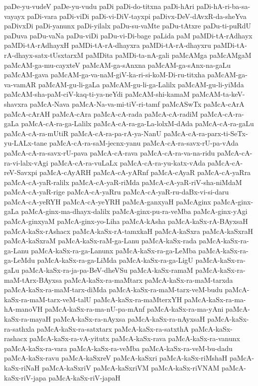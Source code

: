 {paDe-yu-vudeV
paDe-yu-vudu
paDi
paDi-do-titxna
paDi-hAri
paDi-hA-ri-ba-sa-vayayx
paDi-vara
paDi-viDi
paDi-vi-DiV-tayxpi
paDivx-DeV-dAvxR-da-sheYva
paDivxDi
paDi-yanunx
paDi-yilalx
paDu-su-vaMte
paDu-tAtxre
paDu-ti-puRdU
paDuva
paDu-vaNa
paDu-viDi
paDu-vi-Di-bage
paLida
paM
paMDi-tA-rAdhayx
paMDi-tA-rAdhayxH
paMDi-tA-rA-dhayxra
paMDi-tA-rA-dhayxru
paMDi-tA-rA-dhayx-satx-tUsxtarxM
paMDita
paMDi-ta-nA-gali
paMcAMga
paMcAMgaM
paMcAM-ga-mu-cayxteV
paMcAM-ga-sAnxna
paMcAM-ga-sAnx-na-gaLu
paMcAM-gava
paMcAM-ga-va-naM-giV-ka-ri-si-koM-Di-ru-titxha
paMcAM-ga-va-vamAR
paMcAM-gu-li-gaLa
paMcAM-gu-li-ga-Lalilx
paMcAM-gu-li-yiMda
paMcAM-sha-paM-ciV-kaq-ti-ya-neYdi
paMcAM-shi-kamaM
paMcAM-ta-keV-shavxra
paMcA-Nava
paMcA-Na-va-mi-tiV-ri-tamf
paMcASwTx
paMcA-cArA
paMcA-cArAH
paMcA-cAra
paMcA-cA-rada
paMcA-cA-radiM
paMcA-cA-ra-gaLa
paMcA-cA-ra-ga-Lalilx
paMcA-cA-ra-ga-La-lolxM-dAda
paMcA-cA-ra-gaLu
paMcA-cA-ra-mUtiR
paMcA-cA-ra-pa-rA-ya-NanU
paMcA-cA-ra-parx-ti-SeTx-yu-LALx-tane
paMcA-cA-ra-saM-jecnx-yanu
paMcA-cA-ra-savx-rU-pa-vAda
paMcA-cA-ra-savx-rU-pava
paMcA-cA-rava
paMcA-cA-ra-va-na-ridu
paMcA-cA-ra-vi-lalx-vAgi
paMcA-cA-ra-vuLaLx
paMcA-cA-ra-yu-katx-vAda
paMcA-cA-reV-Savxpi
paMcA-cAyARH
paMcA-cA-yARnf
paMcA-cAyaR
paMcA-cA-yaRra
paMcA-cA-yaR-ralilx
paMcA-cA-yaR-riMda
paMcA-cA-yaR-riV-sha-niMdaM
paMcA-cA-yaR-rige
paMcA-cA-yaRru
paMcA-cA-yaR-ru-daBx-vi-si-daru
paMcA-cA-yeRYH
paMcA-cA-yeYRH
paMcA-ganxyaH
paMcAginx
paMcA-ginx-gaLa
paMcA-ginx-ma-dhayx-dalilx
paMcA-ginx-pu-ra-veMba
paMcA-ginx-yAgi
paMcA-ginxyaM
paMcA-ginx-yo-Liha
paMcA-kAsha
paMcA-kaSx-rA-BAyxsaH
paMcA-kaSx-rAshacx
paMcA-kaSx-rA-tamxkaH
paMcA-kaSxra
paMcA-kaSxraH
paMcA-kaSxraM
paMcA-kaSx-raM-ga-Lanu
paMcA-kaSx-rada
paMcA-kaSx-ra-ga-Lanu
paMcA-kaSx-ra-ga-Lanunx
paMcA-kaSx-ra-ga-LeMba
paMcA-kaSx-ra-ga-LeMdu
paMcA-kaSx-ra-ga-LiMda
paMcA-kaSx-ra-ga-LigU
paMcA-kaSx-ra-gaLu
paMcA-kaSx-ra-ja-pa-BeV-dheVSu
paMcA-kaSx-ramaM
paMcA-kaSx-ra-maM-tArx-BAyxsa
paMcA-kaSx-ra-maMtarx
paMcA-kaSx-ra-maM-tarxda
paMcA-kaSx-ra-maM-tarx-diMda
paMcA-kaSx-ra-maM-tarx-veM-budu
paMcA-kaSx-ra-maM-tarx-veM-talU
paMcA-kaSx-ra-maMterxYH
paMcA-kaSx-ra-ma-hA-manoVH
paMcA-kaSx-ra-ma-nU-pa-mAnf
paMcA-kaSx-ra-ma-yAni
paMcA-kaSx-ra-mayaH
paMcA-kaSx-ra-nAyxsa
paMcA-kaSx-ra-nAyxsaH
paMcA-kaSx-ra-sathxla
paMcA-kaSx-ra-satxtarx
paMcA-kaSx-ra-satxthA
paMcA-kaSx-rashacx
paMcA-kaSx-ra-vA-yitutx
paMcA-kaSx-rava
paMcA-kaSx-ra-vanunx
paMcA-kaSx-ra-vara
paMcA-kaSx-ra-veMba
paMcA-kaSx-ra-veM-bu-dadu
paMcA-kaSx-ravu
paMcA-kaSxreV
paMcA-kaSxri
paMcA-kaSx-riMshaH
paMcA-kaSx-riNaH
paMcA-kaSxriV
paMcA-kaSxriVM
paMcA-kaSx-riVNAM
paMcA-kaSx-riV-japa
paMcA-kaSx-riV-japaH
}
